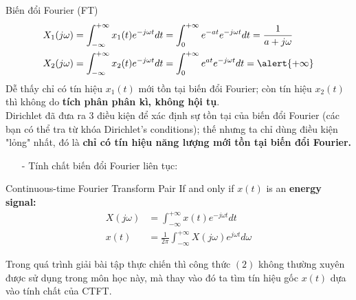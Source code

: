 \documentclass[8pt]{beamer}
\begin{document}
\begin{frame}{Biến đổi Fourier (FT)}
\begin{equation*}
\begin{split}
	X_{1}(j\omega)&=\int_{-\infty}^{+\infty}x_{1}(t)e^{-j\omega t}dt=\int_{0}^{+\infty}e^{-at}e^{-j\omega t}dt=\frac{1}{a+j\omega}\\
	X_{2}(j\omega)&=\int_{-\infty}^{+\infty}x_{2}(t)e^{-j\omega t}dt=\int_{0}^{+\infty}e^{at}e^{-j\omega t}dt=\alert{+\infty}
\end{split}
\end{equation*}
Dễ thấy chỉ có tín hiệu $x_{1}(t)$ mới tồn tại biến đổi Fourier; còn tín hiệu $x_{2}(t)$ thì không do \textbf{tích phân phân kì, không hội tụ}.
\\ Dirichlet đã đưa ra 3 điều kiện để xác định sự tồn tại của biến đổi Fourier (các bạn có thể tra từ khóa Dirichlet's conditions); thế nhưng ta chỉ dùng điều kiện "lỏng" nhất, đó là \textbf{chỉ có tín hiệu năng lượng mới tồn tại biến đổi Fourier.} 
\begin{itemize}
	\item[-] Tính chất biến đổi Fourier liên tục:
\end{itemize}
\begin{block}{Continuous-time Fourier Transform Pair}
If and only if $x(t)$ is an \textbf{\alert{energy signal:}}
\begin{equation*}
\begin{split}
	X(j\omega)&=\int_{-\infty}^{+\infty}x(t)e^{-j\omega t}dt\\
	x(t)&=\frac{1}{2\pi}\int_{-\infty}^{+\infty}X(j\omega)e^{j\omega t}d\omega
	\end{split}
\end{equation*}
\end{block}
 Trong quá trình giải bài tập thực chiến thì công thức $(2)$ không thường xuyên được sử dụng trong môn học này, mà thay vào đó ta tìm tín hiệu gốc $x(t)$ dựa vào tính chất của CTFT.
\end{frame}
\end{document}

